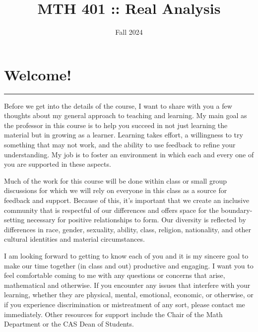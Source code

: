 \documentclass[
  letterpaper,
  DIV=11,
  numbers=noendperiod]{scrreprt}
\title{MTH 401 :: Real Analysis}
\subtitle{Fall 2024}
\author{}
\date{}
\renewcommand*\contentsname{Table of contents}
\newcommand\contentsname{Table of contents}
\begin{document}
\maketitle

\renewcommand*\contentsname{Table of contents}
{
\hypersetup{linkcolor=}
\setcounter{tocdepth}{2}
\tableofcontents
}

\chapter*{Welcome!}\label{welcome}


\begin{center}\rule{0.5\linewidth}{0.5pt}\end{center}

Before we get into the details of the course, I want to share with you a
few thoughts about my general approach to teaching and learning. My main
goal as the professor in this course is to help you succeed in not just
learning the material but in growing as a learner. Learning takes
effort, a willingness to try something that may not work, and the
ability to use feedback to refine your understanding. My job is to
foster an environment in which each and every one of you are supported
in these aspects.

Much of the work for this course will be done within class or small
group discussions for which we will rely on everyone in this class as a
source for feedback and support. Because of this, it's important that we
create an inclusive community that is respectful of our differences and
offers space for the boundary-setting necessary for positive
relationships to form. Our diversity is reflected by differences in
race, gender, sexuality, ability, class, religion, nationality, and
other cultural identities and material circumstances.

I am looking forward to getting to know each of you and it is my sincere
goal to make our time together (in class and out) productive and
engaging. I want you to feel comfortable coming to me with any questions
or concerns that arise, mathematical and otherwise. If you encounter any
issues that interfere with your learning, whether they are physical,
mental, emotional, economic, or otherwise, or if you experience
discrimination or mistreatment of any sort, please contact me
immediately. Other resources for support include the Chair of the Math
Department or the CAS Dean of Students.
\end{document}
